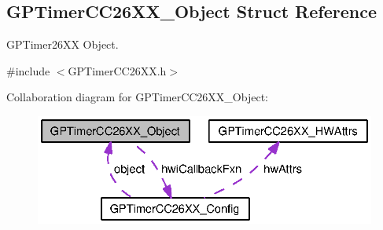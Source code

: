 \subsection{G\+P\+Timer\+C\+C26\+X\+X\+\_\+\+Object Struct Reference}
\label{struct_g_p_timer_c_c26_x_x___object}


G\+P\+Timer26\+X\+X Object.  




{\ttfamily \#include $<$G\+P\+Timer\+C\+C26\+X\+X.\+h$>$}



Collaboration diagram for G\+P\+Timer\+C\+C26\+X\+X\+\_\+\+Object\+:
\nopagebreak
\begin{figure}[H]
\begin{center}
\leavevmode
\includegraphics[width=321pt]{struct_g_p_timer_c_c26_x_x___object__coll__graph}
\end{center}
\end{figure}

